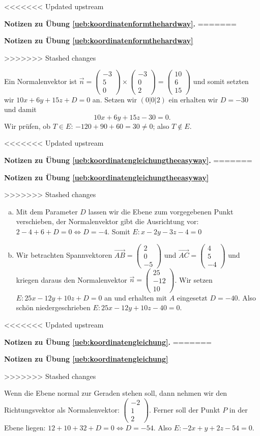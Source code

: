 \documentclass[%
11pt,%
twoside,%
titlepage,%
<<<<<<< Updated upstream
german,%
=======
swissgerman,%
>>>>>>> Stashed changes
headsepline%
]{scrartcl}
\newcommand{\faReturnGray}{\textcolor{gray}{\faMailReply}} %
\theoremstyle{definition}
\theoremstyle{plain}
\newcommand{\concatueb}[1]{ueb:#1}%
\newcommand{\concatlsg}[1]{lsg:#1}%
\newenvironment{lsg}[1]{%
<<<<<<< Updated upstream
    \par\noindent\textbf{Notizen zu Übung \ref{\concatueb{#1}}.}%
    \label{\concatlsg{#1}}
=======
    \par\noindent\textbf{Notizen zu Übung \ref{\concatueb{#1}}}\label{\concatlsg{#1}}
    \hfill\hyperref[\concatueb{#1}]{\faReturnGray}\par %
>>>>>>> Stashed changes
}{%
    \par%
}
\begin{document}
\begin{lsg}{koordinatenformthehardway}
Ein Normalenvektor ist $\vec{n}=\begin{pmatrix}
    -3\\5\\0
\end{pmatrix}\times\begin{pmatrix}
    -3\\0\\2
\end{pmatrix}=\begin{pmatrix}
    10\\6\\15
\end{pmatrix}$
und somit setzten wir $10x+6y+15z+D=0$ an. Setzen wir $(0|0|2)$ ein erhalten wir $D=-30$ und damit
$$10x+6y+15z-30=0.$$
Wir prüfen, ob $T\in E$: $-120+90+60=30\neq0$; also $T\not\in E$.
\end{lsg}
\begin{lsg}{koordinatengleichungtheeasyway}
\begin{enumerate}[a)]
    \item Mit dem Parameter $D$ lassen wir die Ebene zum vorgegebenen Punkt verschieben, der Normalenvektor gibt die Ausrichtung vor: $2-4+6+D=0\Leftrightarrow D=-4$. Somit $E:x-2y-3z-4=0$

    \item Wir betrachten Spannvektoren $\vec{AB}=\begin{pmatrix}
        2\\0\\-5
    \end{pmatrix}$ und $\vec{AC}=\begin{pmatrix}
        4\\5\\-4
    \end{pmatrix}$ und kriegen daraus den Normalenvektor $\vec{n}=\begin{pmatrix}
        25\\-12\\10
    \end{pmatrix}$. Wir setzen $E:25x-12y+10z+D=0$ an und erhalten mit $A$ eingesetzt $D=-40$. Also schön niedergeschrieben $E:25x-12y+10z-40=0$.
\end{enumerate}
\end{lsg}
\begin{lsg}{koordinatengleichung}
Wenn die Ebene normal zur Geraden stehen soll, dann nehmen wir den Richtungsvektor als Normalenvektor: $\begin{pmatrix}
    -2\\1\\2
\end{pmatrix}$. Ferner soll der Punkt $P$ in der Ebene liegen: $12+10+32+D=0\Leftrightarrow D=-54$. Also $E: -2x+y+2z-54=0$.
\end{lsg}
\end{document}
